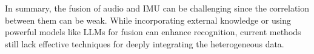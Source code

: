In summary, the fusion of audio and IMU can be challenging since the correlation between them can be weak. While incorporating external knowledge or using powerful models like LLMs for fusion can enhance recognition, current methods still lack effective techniques for deeply integrating the heterogeneous data.
